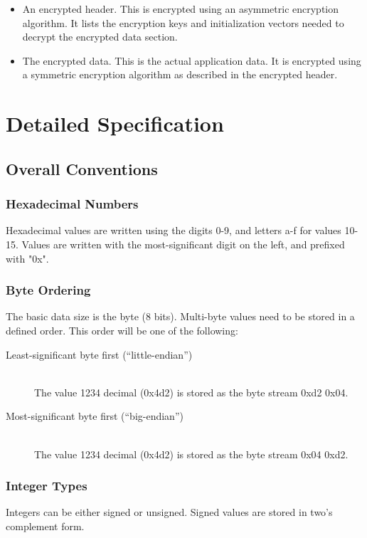 \documentclass[10pt]{article}
\begin{document}
{\begin{itemize}
\item An encrypted header.  This is encrypted using an asymmetric encryption algorithm.
It lists the encryption keys and initialization vectors needed to decrypt the encrypted data section.

\item The encrypted data.
This is the actual application data.
It is encrypted using a symmetric encryption algorithm as described in the encrypted header.
\end{itemize}

\section{Detailed Specification}
\subsection{Overall Conventions}
\subsubsection{Hexadecimal Numbers}
Hexadecimal values are written using the digits 0-9, and letters a-f for values 10-15.
Values are written with the most-significant digit on the left, and prefixed with "0x".

\subsubsection{Byte Ordering}
The basic data size is the byte (8 bits).
Multi-byte values need to be stored in a defined order.
This order will be one of the following:
\begin{description}
\item[Least-significant byte first (``little-endian'')]~\\
The value 1234 decimal (0x4d2) is stored as the byte stream 0xd2 0x04.

\item[Most-significant byte first (``big-endian'')]~\\
The value 1234 decimal (0x4d2) is stored as the byte stream 0x04 0xd2.
\end{description}

\subsubsection{Integer Types}
Integers can be either signed or unsigned.
Signed values are stored in two's complement form.

}
\end{document}
